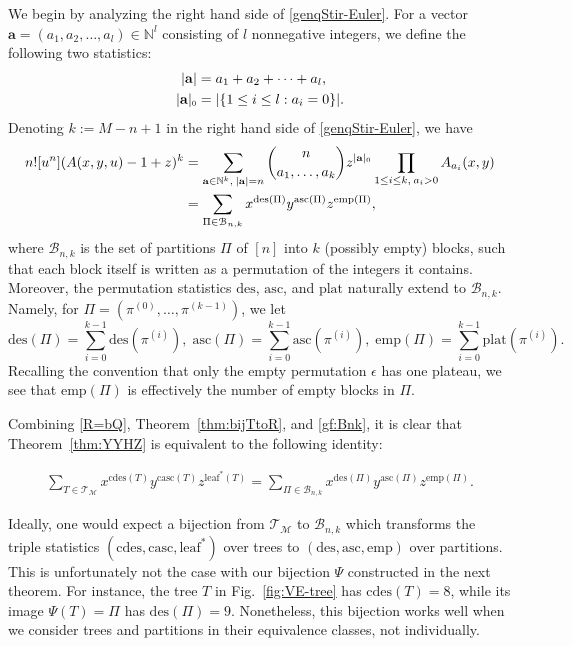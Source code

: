 \documentclass[11pt,reqno]{amsart}
\numberwithin{equation}{section}
\def\redt{\textcolor{red}}
\theoremstyle{plain}
\theoremstyle{definition}
\newcommand{\N}{\mathbb{N}}
\newcommand{\M}{\mathcal{M}}
\newcommand{\T}{\mathcal{T}}
\newcommand{\B}{\mathcal{B}}
\def\des{\mathrm{des}}
\def\asc{\mathrm{asc}}
\def\cdes{\mathrm{cdes}}
\def\casc{\mathrm{casc}}
\def\plat{\mathrm{plat}}
\def\lleaf{\mathrm{leaf}^*}
\def\emp{\mathrm{emp}}
\begin{document}
We begin by analyzing the right hand side of \eqref{genqStir-Euler}. For a vector $\mathbf{a}=(a_1,a_2,\ldots,a_l)\in \N^l$ consisting of $l$ nonnegative integers, we define the following two statistics:
\begin{align*}
|\mathbf{a}| &=a_1+a_2+\cdots+a_l,\\
|\mathbf{a}|_{\scaleto{0}{3.5pt}} &= |\{1\le i\le l:a_i=0\}|.
\end{align*}
Denoting $k:=M-n+1$ in the right hand side of \eqref{genqStir-Euler}, we have
\begin{align}
n![u^n](A(x,y,u)-1+z)^k &= \sum_{\mathbf{a}\in\N^{k},\:|\mathbf{a}|=n}\binom{n}{a_1,\ldots,a_k}z^{|\mathbf{a}|_{\scaleto{0}{3pt}}}\prod_{1\le i\le k,\:a_i>0}A_{a_i}(x,y) \nonumber \\
&=\sum_{\Pi\in\B_{n,k}}x^{\des(\Pi)}y^{\asc(\Pi)}z^{\emp(\Pi)},\label{gf:Bnk}
\end{align}
where $\B_{n,k}$ is the set of partitions $\Pi$ of $[n]$ into $k$ (possibly empty) blocks, such that each block itself is written as a permutation of the integers it contains. Moreover, the permutation statistics $\des$, $\asc$, and $\plat$ naturally extend to $\B_{n,k}$. Namely, for $\Pi=(\pi^{(0)},\ldots,\pi^{(k-1)})$, we let
$$\des(\Pi)=\sum_{i=0}^{k-1} \des(\pi^{(i)}),\; \asc(\Pi)=\sum_{i=0}^{k-1} \asc(\pi^{(i)}),\; \emp(\Pi)=\sum_{i=0}^{k-1} \plat(\pi^{(i)}).$$
Recalling the convention that only the empty permutation $\epsilon$ has one plateau, we see that $\emp(\Pi)$ is effectively the number of empty blocks in $\Pi$.

Combining \eqref{R=bQ}, Theorem~\ref{thm:bijTtoR}, and \eqref{gf:Bnk}, it is clear that Theorem~\ref{thm:YYHZ} is equivalent to the following identity:

\begin{align}\label{triplestat:T=B}
\sum_{T\in\T_{\M}}x^{\cdes(T)}y^{\casc(T)}z^{\lleaf(T)}=\sum_{\Pi\in\B_{n,k}}x^{\des(\Pi)}y^{\asc(\Pi)}z^{\emp(\Pi)}.
\end{align}

Ideally, one would expect a bijection from $\T_{\M}$ to $\B_{n,k}$ which transforms the triple statistics $(\cdes,\casc,\lleaf)$ over trees to $(\des,\asc,\emp)$ over partitions. This is unfortunately not the case with our bijection $\Psi$ constructed in the next theorem. For instance, the tree $T$ in Fig.~\ref{fig:VE-tree} has $\cdes(T)=8$, while its image $\Psi(T)=\Pi$ has $\des(\Pi)=9$. Nonetheless, this bijection works well when we consider trees and partitions in their equivalence classes, not individually.
\end{document}
